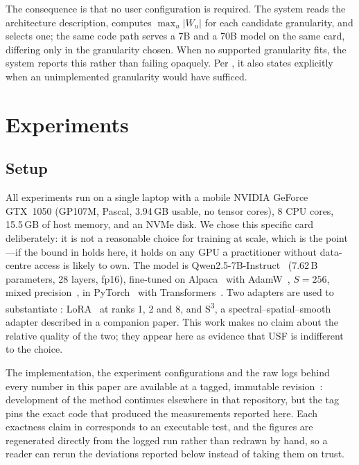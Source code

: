 \documentclass[journal]{IEEEtran}
\newcommand{\usf}{USF}
\newcommand{\Wu}{\lvert W_u \rvert}
\newcommand{\sthree}{S\textsuperscript{3}}
\begin{document}
The consequence is that no user configuration is required. The system reads the architecture
description, computes $\max_u \Wu$ for each candidate granularity, and selects one; the same code
path serves a 7B and a 70B model on the same card, differing only in the granularity chosen. When
no supported granularity fits, the system reports this rather than failing opaquely. Per
, it also states explicitly when an unimplemented granularity would have
sufficed.

\section{Experiments}
\label{sec:exp}

\subsection{Setup}

All experiments run on a single laptop with a mobile NVIDIA GeForce GTX~1050 (GP107M, Pascal,
3.94\,GB usable, no tensor cores), 8 CPU cores, 15.5\,GB of host memory, and an NVMe disk. We chose
this specific card deliberately: it is not a reasonable choice for training at scale, which is the
point---if the bound in  holds here, it holds on any GPU a practitioner without
data-centre access is likely to own. The model is
Qwen2.5-7B-Instruct~\cite{qwen2025} (7.62\,B parameters, 28 layers, fp16), fine-tuned on
Alpaca~\cite{alpaca2023} with AdamW~\cite{loshchilov2019adamw}, $S=256$, mixed
precision~\cite{micikevicius2018mixed}, in PyTorch~\cite{paszke2019pytorch} with
Transformers~\cite{wolf2020transformers}. Two adapters are used to substantiate
: LoRA~\cite{hu2022lora} at ranks 1, 2 and 8, and \sthree{}, a
spectral--spatial--smooth adapter described in a companion paper. This work makes no claim about
the relative quality of the two; they appear here as evidence that \usf{} is indifferent to the
choice.

The implementation, the experiment configurations and the raw logs behind every number in this
paper are available at a tagged, immutable revision~\cite{usfcode}: development of the method
continues elsewhere in that repository, but the tag pins the exact code that produced the
measurements reported here. Each exactness claim in  corresponds to an executable
test, and the figures are regenerated directly from the logged run rather than redrawn by hand, so
a reader can rerun the deviations reported below instead of taking them on trust.
\end{document}
